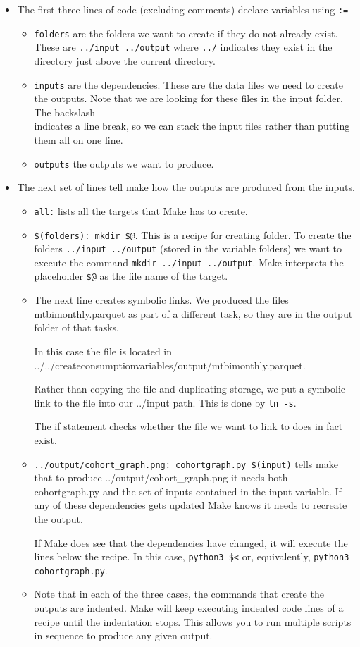 \begin{itemize}
	\item The first three lines of code (excluding comments) declare variables using \texttt{:=}
	\begin{itemize}
		\item \texttt{folders} are the folders we want to create if they do not already exist. These are \texttt{../input ../output} where \texttt{../} indicates they exist in the directory just above the current directory.
		\item \texttt{inputs} are the dependencies. These are the data files we need to create the outputs. Note that we are looking for these files in the input folder. The backslash \texttt{\\} indicates a line break, so we can stack the input files rather than putting them all on one line.
		\item \texttt{outputs} the outputs we want to produce.
	\end{itemize}
	\item The next set of lines tell make how the outputs are produced from the inputs.
	\begin{itemize}
		\item \texttt{all:} lists all the targets that Make has to create. 
		\item \texttt{\$(folders): mkdir \$@}. This is a recipe for creating folder. To create the folders \texttt{../input ../output} (stored in the variable folders) we want to execute the command \texttt{mkdir ../input ../output}. Make interprets the placeholder \texttt{\$@} as the file name of the target.
		\item The next line creates symbolic links. We produced the files mtbimonthly.parquet as part of a different task, so they are in the output folder of that tasks. 
		
		In this case the file is located in ../../createconsumptionvariables/output/mtbimonthly.parquet.
		
		Rather than copying the file and duplicating storage, we put a symbolic link to the file into our ../input path. This is done by \texttt{ln -s}.
		
		The if statement checks whether the file we want to link to does in fact exist.
		\item \texttt{../output/cohort\_graph.png: cohortgraph.py  \$(input)} tells make that to produce ../output/cohort\_graph.png it needs both cohortgraph.py and the set of inputs contained in the input variable. If any of these dependencies gets updated Make knows it needs to recreate the output.
		
		If Make does see that the dependencies have changed, it will execute the lines below the recipe. In this case, \texttt{python3 \$<} or, equivalently, \texttt{python3 cohortgraph.py}.
		
		\item Note that in each of the three cases, the commands that create the outputs are indented. Make will keep executing indented code lines of a recipe until the indentation stops. This allows you to run multiple scripts in sequence to produce any given output.
	\end{itemize}
\end{itemize}

